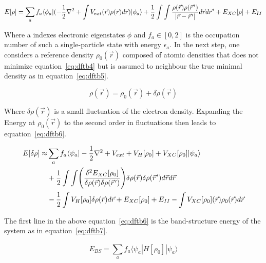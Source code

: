 \documentclass[11pt]{article}
\newcommand{\pvec}[1]{\vec{#1}\mkern2mu\vphantom{#1}}
\begin{document}
\begin{equation}
  E[\rho] = \sum_{a}^{} f_a \langle\phi_a|(-\frac{1}{2}\nabla^2 + \int V_{ext}(\vec{r})\rho(\vec{r})d\vec{r})|\phi_a\rangle + \frac{1}{2}\int\int \frac{\rho(\vec{r})\rho(\pvec{r}')}{|\vec{r}-\pvec{r}'|}d\vec{r}d\pvec{r}' + E_{XC}[\rho] + E_{II}
  \label{eq:dftb4}
\end{equation}

\bigskip

\noindent Where a indexes electronic eigenstates $\phi$ and $f_a \in [0,2]$ is the occupation number of such a single-particle state with energy $\epsilon_a$.
In the next step, one considers a reference density $\rho_0(\vec{r})$ composed of atomic densities that does not minimize equation~\ref{eq:dftb4} but is assumed to neighbour the true minimal density as in equation~\ref{eq:dftb5}.

\begin{equation}
  \rho(\vec{r}) = \rho_0(\vec{r}) + \delta\rho(\vec{r})
  \label{eq:dftb5}
\end{equation}

\bigskip

\noindent Where $\delta\rho(\vec{r})$ is a small fluctuation of the electron density. Expanding the Energy at $\rho_0(\vec{r})$ to the second order in fluctuations then leads to equation~\ref{eq:dftb6}.

\begin{align}\label{eq:dftb6}
    E[\delta\rho] \approx &\sum_{a}^{} f_a \langle\psi_a|-\frac{1}{2}\nabla^2+V_{ext} + V_H[\rho_0] + V_{XC}[\rho_0]|\psi_a\rangle \\
    &+ \frac{1}{2}\int\int \Biggl(\frac{\delta^2E_{XC}[\rho_0]}{\delta\rho(\vec{r})\delta\rho(\pvec{r}')}\Biggr)\delta\rho(\vec{r})\delta\rho(\pvec{r}')d\vec{r}d\pvec{r} \notag \\
    &-\frac{1}{2}\int V_H[\rho_0]\delta\rho(\vec{r})d\vec{r} + E_{XC}[\rho_0] + E_{II} - \int V_{XC}[\rho_0](\vec{r})\rho_0(\vec{r})d\vec{r} \notag
\end{align}

\bigskip

\noindent The first line in the above equation~\ref{eq:dftb6} is the band-structure energy of the system as in equation~\ref{eq:dftb7}.

\begin{equation}
  E_{BS} = \sum_{a}^{} f_a \langle\psi_a|H[\rho_0]|\psi_a\rangle
  \label{eq:dftb7}
\end{equation}

\bigskip
\end{document}
